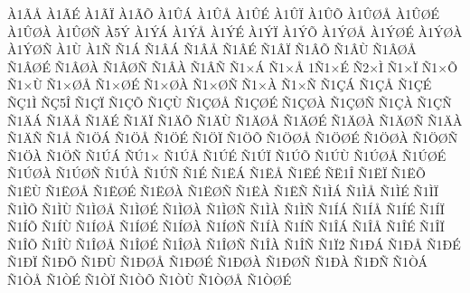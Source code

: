 {^^c01^^c3^^c5
^^c01^^c3^^c9
^^c01^^c3^^cf
^^c01^^c3^^d5
^^c01^^db^^c1
^^c01^^db^^c5
^^c01^^db^^c9
^^c01^^db^^cf
^^c01^^db^^d5
^^c01^^db^^d8^^c5
^^c01^^db^^d8^^c9
^^c01^^db^^d8^^c0
^^c01^^db^^d8^^d1
^^c05^^dd
^^c01^^dd^^c1
^^c01^^dd^^c5
^^c01^^dd^^c9
^^c01^^dd^^cf
^^c01^^dd^^d5
^^c01^^dd^^d8^^c5
^^c01^^dd^^d8^^c9
^^c01^^dd^^d8^^c0
^^c01^^dd^^d8^^d1
^^c01^^d9
^^c01^^d1
^^d11^^c1
^^d11^^c2^^c1
^^d11^^c2^^c5
^^d11^^c2^^c9
^^d11^^c2^^cf
^^d11^^c2^^d5
^^d11^^c2^^d9
^^d11^^c2^^d8^^c5
^^d11^^c2^^d8^^c9
^^d11^^c2^^d8^^c0
^^d11^^c2^^d8^^d1
^^d11^^c2^^c0
^^d11^^c2^^d1
^^d11^^d7^^c1
^^d11^^d7^^c5
1^^d11^^d7^^c9
^^d12^^d7^^cc
^^d11^^d7^^cf
^^d11^^d7^^d5
^^d11^^d7^^d9
^^d11^^d7^^d8^^c5
^^d11^^d7^^d8^^c9
^^d11^^d7^^d8^^c0
^^d11^^d7^^d8^^d1
^^d11^^d7^^c0
^^d11^^d7^^d1
^^d11^^c7^^c1
^^d11^^c7^^c5
^^d11^^c7^^c9
^^d1^^c71^^cc
^^d1^^c75^^ce
^^d11^^c7^^cf
^^d11^^c7^^d5
^^d11^^c7^^d9
^^d11^^c7^^d8^^c5
^^d11^^c7^^d8^^c9
^^d11^^c7^^d8^^c0
^^d11^^c7^^d8^^d1
^^d11^^c7^^c0
^^d11^^c7^^d1
^^d11^^c4^^c1
^^d11^^c4^^c5
^^d11^^c4^^c9
^^d11^^c4^^cf
^^d11^^c4^^d5
^^d11^^c4^^d9
^^d11^^c4^^d8^^c5
^^d11^^c4^^d8^^c9
^^d11^^c4^^d8^^c0
^^d11^^c4^^d8^^d1
^^d11^^c4^^c0
^^d11^^c4^^d1
^^d11^^c5
^^d11^^d6^^c1
^^d11^^d6^^c5
^^d11^^d6^^c9
^^d11^^d6^^cf
^^d11^^d6^^d5
^^d11^^d6^^d8^^c5
^^d11^^d6^^d8^^c9
^^d11^^d6^^d8^^c0
^^d11^^d6^^d8^^d1
^^d11^^d6^^c0
^^d11^^d6^^d1
^^d11^^da^^c1
^^d1^^da1^^d7
^^d11^^da^^c5
^^d11^^da^^c9
^^d11^^da^^cf
^^d11^^da^^d5
^^d11^^da^^d9
^^d11^^da^^d8^^c5
^^d11^^da^^d8^^c9
^^d11^^da^^d8^^c0
^^d11^^da^^d8^^d1
^^d11^^da^^c0
^^d11^^da^^d1
^^d11^^c9
^^d11^^cb^^c1
^^d11^^cb^^c5
^^d11^^cb^^c9
^^d1^^cb1^^ce
^^d11^^cb^^cf
^^d11^^cb^^d5
^^d11^^cb^^d9
^^d11^^cb^^d8^^c5
^^d11^^cb^^d8^^c9
^^d11^^cb^^d8^^c0
^^d11^^cb^^d8^^d1
^^d11^^cb^^c0
^^d11^^cb^^d1
^^d11^^cc^^c1
^^d11^^cc^^c5
^^d11^^cc^^c9
^^d11^^cc^^cf
^^d11^^cc^^d5
^^d11^^cc^^d9
^^d11^^cc^^d8^^c5
^^d11^^cc^^d8^^c9
^^d11^^cc^^d8^^c0
^^d11^^cc^^d8^^d1
^^d11^^cc^^c0
^^d11^^cc^^d1
^^d11^^cd^^c1
^^d11^^cd^^c5
^^d11^^cd^^c9
^^d11^^cd^^cf
^^d11^^cd^^d5
^^d11^^cd^^d9
^^d11^^cd^^d8^^c5
^^d11^^cd^^d8^^c9
^^d11^^cd^^d8^^c0
^^d11^^cd^^d8^^d1
^^d11^^cd^^c0
^^d11^^cd^^d1
^^d11^^ce^^c1
^^d11^^ce^^c5
^^d11^^ce^^c9
^^d11^^ce^^cf
^^d11^^ce^^d5
^^d11^^ce^^d9
^^d11^^ce^^d8^^c5
^^d11^^ce^^d8^^c9
^^d11^^ce^^d8^^c0
^^d11^^ce^^d8^^d1
^^d11^^ce^^c0
^^d11^^ce^^d1
^^d11^^cf2
^^d11^^d0^^c1
^^d11^^d0^^c5
^^d11^^d0^^c9
^^d11^^d0^^cf
^^d11^^d0^^d5
^^d11^^d0^^d9
^^d11^^d0^^d8^^c5
^^d11^^d0^^d8^^c9
^^d11^^d0^^d8^^c0
^^d11^^d0^^d8^^d1
^^d11^^d0^^c0
^^d11^^d0^^d1
^^d11^^d2^^c1
^^d11^^d2^^c5
^^d11^^d2^^c9
^^d11^^d2^^cf
^^d11^^d2^^d5
^^d11^^d2^^d9
^^d11^^d2^^d8^^c5
^^d11^^d2^^d8^^c9
}
